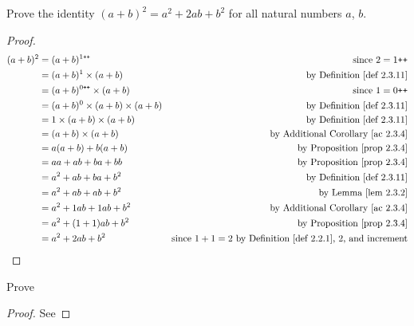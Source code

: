 \begin{exercise}\label{exercise 2.3.4}
Prove the identity \((a + b)^2 = a^2 + 2ab + b^2\) for all natural numbers \(a\), \(b\).
\end{exercise}
\begin{proof}
\begin{align*}
    (a + b)^2 & = (a + b)^{1\INC} & \text{since \(2 = 1\INC\)} \\
              & = (a + b)^1 \X (a + b) & \text{by \DEF{2.3.11}} \\
              & = (a + b)^{0\INC} \X (a + b) & \text{since \(1 = 0\INC\)} \\
              & = (a + b)^0 \X (a + b) \X (a + b) & \text{by \DEF{2.3.11}} \\
              & = 1 \X (a + b) \X (a + b) & \text{by \DEF{2.3.11}} \\
              & = (a + b) \X (a + b) & \text{by \AC{2.3.4}} \\
              & = a(a + b) + b(a + b) & \text{by \PROP{2.3.4}} \\
              & = aa + ab + ba + bb & \text{by \PROP{2.3.4}} \\
              & = a^2 + ab + ba + b^2 & \text{by \DEF{2.3.11}} \\
              & = a^2 + ab + ab + b^2 & \text{by \LEM{2.3.2}} \\
              & = a^2 + 1ab + 1ab + b^2 & \text{by \AC{2.3.4}} \\
              & = a^2 + (1 + 1)ab + b^2 & \text{by \PROP{2.3.4}} \\
              & = a^2 + 2ab + b^2 & \text{since \(1 + 1 = 2\) by \DEF{2.2.1}, \(2\), and increment}
\end{align*}
\end{proof}

\begin{exercise}\label{exercise 2.3.5}
    Prove 
\end{exercise}
\begin{proof}
    See 
\end{proof}
